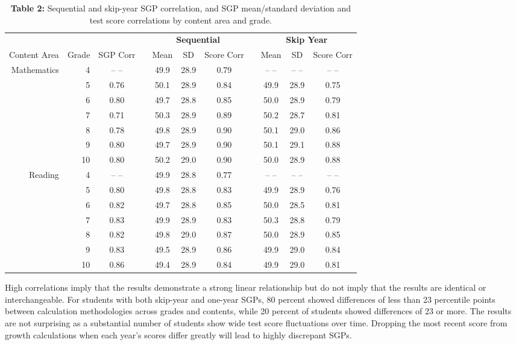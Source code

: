 \documentclass[12pt]{article}
\begin{document}
\begin{table}[H]
\caption*{\textbf{Table 2:} Sequential and skip-year SGP correlation, and SGP mean/standard deviation and test score correlations by content area and grade.\label{table2}} 
\begin{center}
\begin{tabular}{rrccccccccc}
\hline\hline
\multicolumn{3}{c}{\bfseries }&\multicolumn{1}{c}{\bfseries }&\multicolumn{3}{c}{\bfseries Sequential}&\multicolumn{1}{c}{\bfseries }&\multicolumn{3}{c}{\bfseries Skip Year}\tabularnewline
\cline{5-7} \cline{9-11}
\multicolumn{1}{c}{Content Area}&\multicolumn{1}{c}{Grade}&\multicolumn{1}{c}{SGP Corr}&\multicolumn{1}{c}{}&\multicolumn{1}{c}{Mean}&\multicolumn{1}{c}{SD}&\multicolumn{1}{c}{Score Corr}&\multicolumn{1}{c}{}&\multicolumn{1}{c}{Mean}&\multicolumn{1}{c}{SD}&\multicolumn{1}{c}{Score Corr}\tabularnewline
\hline
Mathematics& 4& -- -- &&49.9&28.9&0.79&& -- -- & -- -- & -- -- \tabularnewline
& 5&0.76&&50.1&28.9&0.84&&49.9&28.9&0.75\tabularnewline
& 6&0.80&&49.7&28.8&0.85&&50.0&28.9&0.79\tabularnewline
& 7&0.71&&50.3&28.9&0.89&&50.2&28.7&0.81\tabularnewline
& 8&0.78&&49.8&28.9&0.90&&50.1&29.0&0.86\tabularnewline
& 9&0.80&&49.7&28.9&0.90&&50.1&29.1&0.88\tabularnewline
&10&0.80&&50.2&29.0&0.90&&50.0&28.9&0.88\tabularnewline
Reading& 4& -- -- &&49.9&28.8&0.77&& -- -- & -- -- & -- -- \tabularnewline
& 5&0.80&&49.8&28.8&0.83&&49.9&28.9&0.76\tabularnewline
& 6&0.82&&49.7&28.8&0.85&&50.0&28.5&0.81\tabularnewline
& 7&0.83&&49.9&28.9&0.83&&50.3&28.8&0.79\tabularnewline
& 8&0.82&&49.8&29.0&0.87&&50.0&28.9&0.85\tabularnewline
& 9&0.83&&49.5&28.9&0.86&&49.9&29.0&0.84\tabularnewline
&10&0.86&&49.4&28.9&0.84&&49.9&29.0&0.81\tabularnewline
\hline
\end{tabular}\end{center}
\end{table}

High correlations imply that the results demonstrate a strong linear
relationship but do not imply that the results are identical or
interchangeable. For students with both skip-year and one-year SGPs, 80
percent showed differences of less than 23 percentile points between
calculation methodologies across grades and contents, while 20 percent
of students showed differences of 23 or more. The results are not
surprising as a substantial number of students show wide test score
fluctuations over time. Dropping the most recent score from growth
calculations when each year's scores differ greatly will lead to highly
discrepant SGPs.
\end{document}
